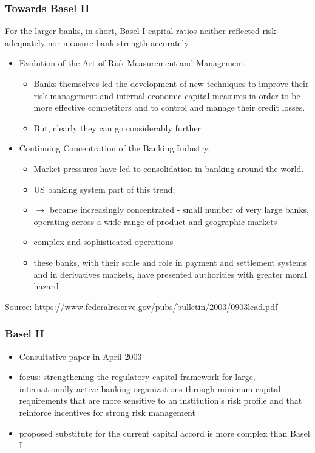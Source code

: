 \documentclass[11pt]{beamer}
\begin{document}
\begin{frame}
\frametitle{Towards Basel II}
For the larger banks, in short, Basel I capital ratios neither reflected risk adequately nor measure bank strength accurately
\begin{itemize}
\item Evolution of the Art of Risk Measurement and Management.
\begin{itemize}
\item Banks themselves led the development of new techniques to improve their risk management and internal economic capital measures in order to be more effective competitors and to control and manage their credit
losses.
\item But, clearly they can go considerably further
\end{itemize}
\item Continuing Concentration of the Banking Industry.
\begin{itemize}
\item Market pressures have led to consolidation in banking around the world.
\item US banking system part of this trend;
\item $\rightarrow$ became increasingly concentrated - small number of very large banks, operating across a wide range of product and
geographic markets
\item complex and sophisticated operations
\item these banks, with their scale and role in payment and settlement systems and in derivatives markets, have presented authorities with greater moral hazard
\end{itemize}
\end{itemize}

\tiny{Source: https://www.federalreserve.gov/pubs/bulletin/2003/0903lead.pdf}
\end{frame}


\begin{frame}
\frametitle{Basel II}
\begin{itemize}
\item Consultative paper in April 2003
\item focus: strengthening the regulatory capital framework for large, internationally active banking organizations through minimum capital requirements that are more sensitive to an institution's risk
profile and that reinforce incentives for strong risk management
\item proposed substitute for the current capital accord is more complex than Basel I
\end{itemize}

\end{frame}
\end{document}
